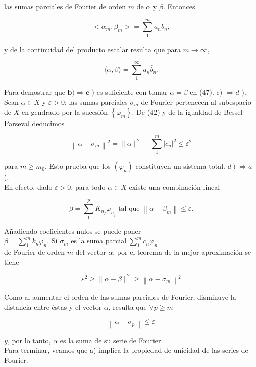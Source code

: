 \documentclass[10pt]{article}
\theoremstyle{plain}
\theoremstyle{definition}
\theoremstyle{remark}
\begin{document}
las sumas parciales de Fourier de orden $m$ de $\alpha$ y $\beta$. Entonces


\begin{equation*}
<\alpha_{m}, \beta_{m}>=\sum_{1}^{m} a_{n} \bar{b}_{n}, \tag{4-9}
\end{equation*}


y de la continuidad del producto escalar resulta que para $m \rightarrow \infty$,

$$
\langle\alpha, \beta\rangle=\sum_{1}^{\infty} a_{n} \bar{b}_{n} .
$$

Para demostrar que $\boldsymbol{b}) \Rightarrow \boldsymbol{c}$ ) es suficiente con tomar $\alpha=\beta$ en (47). c) $\Rightarrow d$ ). Sean $\alpha \in X$ y $\varepsilon>0$; las sumas parciales $\sigma_{m}$ de Fourier pertenecen al subespacio de $X$ en gendrado por la sucesión $\left\{\varphi_{m}\right\}$. De (42) y de la igualdad de Bessel-Parseval deducimos

$$
\left\|\alpha-\sigma_{m}\right\|^{2}=\|\alpha\|^{2}-\sum_{1}^{m}\left|c_{n}\right|^{2} \leqslant \varepsilon^{2}
$$

para $m \geqslant m_{0}$. Esto prueba que los $\left(\varphi_{n}\right)$ constituyen un sistema total. $\left.d\right) \Rightarrow a$ ).\\
En efecto, dado $\varepsilon>0$, para todo $\alpha \in X$ existe una combinación lineal

$$
\beta=\sum_{1}^{p} K_{n_{j}} \varphi_{n_{j}} \text { tal que }\left\|\alpha-\beta_{m}\right\| \leqslant \varepsilon .
$$

Añadiendo coeficientes nulos se puede poner\\
$\beta=\sum_{1}^{m} k_{n} \varphi_{n}$. Si $\sigma_{m}$ es la suma parcial $\sum_{1}^{m} c_{n} \varphi_{n}$\\
de Fourier de orden $m$ del vector $\alpha$, por el teorema de la mejor aproximación se tiene

$$
\varepsilon^{2} \geqslant\|\alpha-\beta\|^{2} \geqslant\left\|\alpha-\sigma_{m}\right\|^{2}
$$

Como al aumentar el orden de las sumas parciales de Fourier, disminuye la distancia entre éstas y el vector $\alpha$, resulta que $\forall p \geqslant m$

$$
\left\|\alpha-\sigma_{p}\right\| \leqslant \varepsilon
$$

$y$, por lo tanto, $\alpha$ es la suma de su serie de Fourier.\\
Para terminar, veamos que a) implica la propiedad de unicidad de las series de Fourier.
\end{document}
